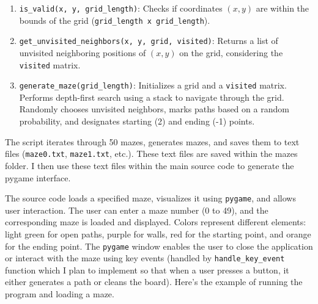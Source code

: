 \begin{enumerate}
    \item \texttt{is\_valid(x, y, grid\_length)}: Checks if coordinates \((x, y)\) are within the bounds of the grid (\texttt{grid\_length x grid\_length}).
    
    \item \texttt{get\_unvisited\_neighbors(x, y, grid, visited)}: Returns a list of unvisited neighboring positions of \((x, y)\) on the grid, considering the \texttt{visited} matrix.
    
    \item \texttt{generate\_maze(grid\_length)}: Initializes a grid and a \texttt{visited} matrix. Performs depth-first search using a stack to navigate through the grid. Randomly chooses unvisited neighbors, marks paths based on a random probability, and designates starting (2) and ending (-1) points.
\end{enumerate}

The script iterates through 50 mazes, generates mazes, and saves them to text files (\texttt{maze0.txt}, \texttt{maze1.txt}, etc.).
These text files are saved within the mazes folder. I then use these text files within the main source code to generate the pygame interface.

The source code loads a specified maze, visualizes it using \texttt{pygame}, and allows user interaction. The user can enter a maze number (0 to 49), and the corresponding maze is loaded and displayed. Colors represent different elements: light green for open paths, purple for walls, red for the starting point, and orange for the ending point. The \texttt{pygame} window enables the user to close the application or interact with the maze using key events (handled by \texttt{handle\_key\_event} function which I plan to implement so that when a user presses a button, it either generates a path or cleans the board). Here's the example of running the program and loading a maze. 


